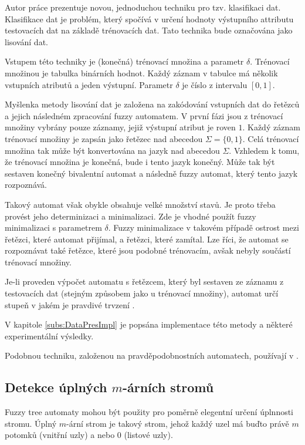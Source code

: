 \documentclass[a4paper,10pt]{article}
\begin{document}
Autor práce prezentuje novou, jednoduchou techniku pro tzv. klasifikaci dat. Klasifikace dat je problém, který spočívá v určení hodnoty výstupního attributu testovacích dat na základě trénovacích dat. Tato technika bude označována jako lisování dat.

Vstupem této techniky je (konečná) trénovací množina a parametr $\delta$. Trénovací množinou je tabulka binárních hodnot. Každý záznam v tabulce má několik vstupních atributů a jeden výstupní. Parametr $\delta$ je číslo z intervalu $[0,1]$.

Myšlenka metody lisování dat je založena na zakódování vstupních dat do řetězců a jejich následném zpracování fuzzy automatem. V první fázi jsou z trénovací množiny vybrány pouze záznamy, jejiž výstupní atribut je roven $1$. Každý záznam trénovací množiny je zapsán jako řetězec nad abecedou $\Sigma = \{ 0, 1 \}$. Celá trénovací množina tak může být konvertována na jazyk nad abecedou $\Sigma$. Vzhledem k tomu, že trénovací množina je konečná, bude i tento jazyk konečný. Může tak být sestaven konečný bivalentní automat a následně fuzzy automat, který tento jazyk rozpoznává.

Takový automat však obykle obsahuje velké množství stavů. Je proto třeba provést jeho determinizaci a minimalizaci. Zde je vhodné použít fuzzy minimalizaci s parametrem $\delta$. Fuzzy minimalizace v takovém případě  ostrost mezi řetězci, které automat přijímal, a řetězci, které zamítal. Lze říci, že automat se  rozpoznávat také řetězce, které jsou podobné trénovacím, avšak nebyly součástí trénovací množiny.

Je-li proveden výpočet automatu s řetězcem, který byl sestaven ze záznamu z testovacích dat (stejným způsobem jako u trénovací množiny), automat určí stupeň v jakém je pravdivé trvzení .

V kapitole \ref{subs:DataPresImpl} je popsána implementace této metody a některé experimentální výsledky.
\begin{note}
  Podobnou techniku, založenou na pravděpodobnostních automatech, používají v \cite{Hac+-ProAnaLarFinStaMac}.
\end{note}


\subsection{Detekce úplných $m$-árních stromů} \label{subs:DetComTrees}
Fuzzy tree automaty mohou být použity pro poměrně elegentní určení úplnnosti stromu. Úplný $m$-ární strom je takový strom, jehož každý uzel má buďto právě $m$ potomků (vnitřní uzly) a nebo $0$ (listové uzly).
\end{document}
